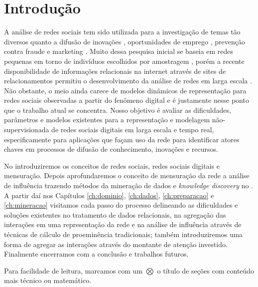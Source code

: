 \chapter{Introdução}
\label{ch:introducao}
A análise de redes sociais tem sido utilizada para a investigação
de temas tão diversos quanto a difusão de inovações \citep{Coleman1966},
oportunidades de emprego \citep{Granovetter1995}, prevenção contra fraude
\citep{Neville2005} e marketing \citep{Domingos2001}. Muito dessa pesquisa
inicial se baseia em redes pequenas em torno de indivíduos escolhidos por amostragem
\citep{Wasserman}\citep{Newman2006}, porém a recente disponibilidade de
informações relacionais na internet através de sites de relacionamentos permitiu o
desenvolvimento da análise de redes em larga escala \citep{Boyd2007}. Não
obstante, o meio ainda carece de modelos dinâmicos de representação para redes
sociais observadas a partir do fenômeno digital \citep{Xiang2010} e é justamente
nesse ponto que o trabalho atual se concentra. Nosso objetivo é avaliar as
dificuldades, parâmetros e modelos existentes para a representação e modelagem
não-supervisionada de redes sociais digitais em larga escala e tempo real,
especificamente para aplicações que façam uso da rede para identificar atores
chaves em processos de difusão de conhecimento, inovações e recursos.

No  introduziremos os conceitos de redes sociais, redes sociais
digitais e mensuração. Depois aprofundaremos o conceito de mensuração da rede a
análise de influência trazendo métodos da mineração de dados e \emph{knowledge
discovery} no . A partir daí nos Capítulos \ref{ch:dominio},
\ref{ch:dados}, \ref{ch:preparacao} e \ref{ch:mineracao} visitamos cada passo do
processo delineando as dificuldades e soluções existentes no tratamento de dados
relacionais, na agregação das interações em uma representação da rede e na
análise de influência através de técnicas de cálculo de proeminência
tradicionais; também introduziremos uma forma de agregar as interações através do
montante de atenção investido. Finalmente encerramos com a conclusão e trabalhos
futuros.

Para facilidade de leitura, marcamos com um $\bigotimes$ o título de seções com
conteúdo mais técnico ou matemático.